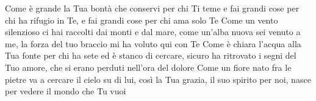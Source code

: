 \beginverse
Come è grande la Tua bontà
che conservi per chi Ti teme
e fai grandi cose per chi ha rifugio in Te,
e fai grandi cose per chi ama solo Te
Come un vento silenzioso
ci hai raccolti dai monti e dal mare,
come un'alba nuova sei venuto a me,
la forza del tuo braccio mi ha voluto qui con Te
Come è chiara l'acqua alla Tua fonte
per chi ha sete ed è stanco di cercare,
sicuro ha ritrovato i segni del Tuo amore,
che si erano perduti nell'ora del dolore
Come un fiore nato fra le pietre
va a cercare il cielo su di lui,
così la Tua grazia, il suo spirito per noi,
nasce per vedere il mondo che Tu vuoi
\endverse
\endsong
